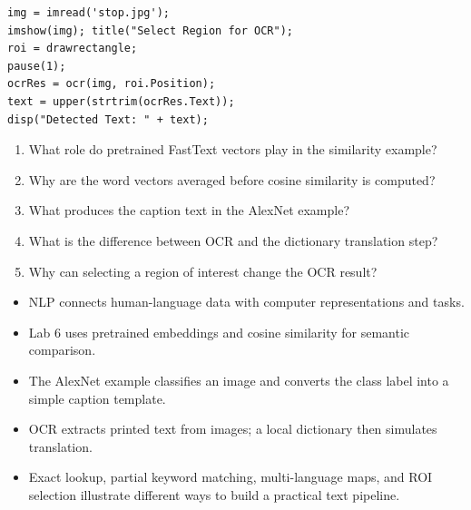 \begin{lstlisting}[style=mlmatlab]
img = imread('stop.jpg');
imshow(img); title("Select Region for OCR");
roi = drawrectangle;
pause(1);
ocrRes = ocr(img, roi.Position);
text = upper(strtrim(ocrRes.Text));
disp("Detected Text: " + text);
\end{lstlisting}



\begin{quickcheck}
\begin{enumerate}
  \item What role do pretrained FastText vectors play in the similarity example?
  \item Why are the word vectors averaged before cosine similarity is computed?
  \item What produces the caption text in the AlexNet example?
  \item What is the difference between OCR and the dictionary translation step?
  \item Why can selecting a region of interest change the OCR result?
\end{enumerate}
\end{quickcheck}

\begin{chapterrecap}
\begin{itemize}
  \item NLP connects human-language data with computer representations and tasks.
  \item Lab 6 uses pretrained embeddings and cosine similarity for semantic comparison.
  \item The AlexNet example classifies an image and converts the class label into a simple caption template.
  \item OCR extracts printed text from images; a local dictionary then simulates translation.
  \item Exact lookup, partial keyword matching, multi-language maps, and ROI selection illustrate different ways to build a practical text pipeline.
\end{itemize}
\end{chapterrecap}
